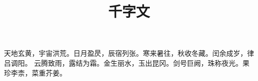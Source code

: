 \documentclass{ltc-cn-vbook}
\title{千字文}
\begin{document}
\begin{正文}
天地玄黄，宇宙洪荒。日月盈昃，辰宿列张。寒来暑往，秋收冬藏。闰余成岁，律吕调阳。
\newpage
云腾致雨，露结为霜。金生丽水，玉出昆冈。剑号巨阙，珠称夜光。果珍李柰，菜重芥姜。
\end{正文}
\end{document}
